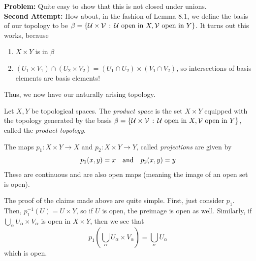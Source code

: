 \textbf{Problem:} Quite easy to show that this is not closed under unions.\\

\textbf{Second Attempt:} How about, in the fashion of Lemma 8.1, we define the basis of our topology to be $\beta = \{\mathcal{U} \times \mathcal{V} \, :\, \mathcal{U} \text{ open in }X, \mathcal{V} \text{ open in }Y\}$. It turns out this works, because
\begin{enumerate}
    \item $X \times Y$ is in $\beta$
    \item $(U_1 \times V_1) \cap (U_2 \times V_2) = (U_1 \cap U_2) \times (V_1 \cap V_2)$, so intersections of basis elements are basis elements!
\end{enumerate}
Thus, we now have our naturally arising topology.

\begin{definition}
    Let $X, Y$ be topological spaces. The \emph{product space} is the set $X \times Y$ equipped with the topology generated by the basis $\beta = \{\mathcal{U} \times \mathcal{V} \, :\, \mathcal{U} \text{ open in }X, \mathcal{V} \text{ open in }Y\}$, called the \emph{product topology}.
\end{definition}

\begin{definition}
    The maps $p_1 : X \times Y \to X$ and $p_2 : X \times Y \to Y$, called \emph{projections} are given by
    \[ p_1(x, y) = x \quad \text{and} \quad p_2(x, y) = y \]
    These are continuous and are also open maps (meaning the image of an open set is open).
\end{definition}
The proof of the claims made above are quite simple. First, just consider $p_1$. Then, $p_1^{-1}(U) = U \times Y$, so if $U$ is open, the preimage is open as well. Similarly, if $\bigcup_{\alpha} U_{\alpha} \times V_{\alpha}$ is open in $X \times Y$, then we see that
\[ p_1\left(\bigcup_{\alpha} U_{\alpha} \times V_{\alpha}\right) = \bigcup_{\alpha} U_{\alpha} \]
which is open.

